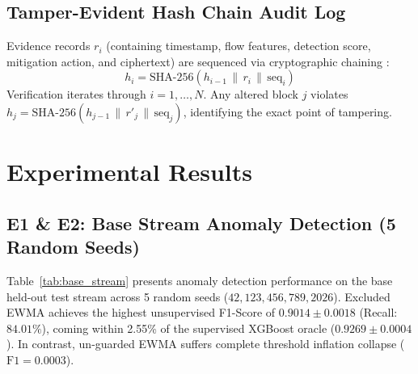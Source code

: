 \documentclass{ieeeaccess}
\begin{document}
\subsection{Tamper-Evident Hash Chain Audit Log}
Evidence records $r_i$ (containing timestamp, flow features, detection score, mitigation action, and ciphertext) are sequenced via cryptographic chaining \cite{haber1991,bellare1996}:
\begin{equation}
h_i = \text{SHA-256}(h_{i-1} \,\|\, r_i \,\|\, \text{seq}_i)
\end{equation}
Verification iterates through $i = 1, \dots, N$. Any altered block $j$ violates $h_j = \text{SHA-256}(h_{j-1} \,\|\, r'_j \,\|\, \text{seq}_j)$, identifying the exact point of tampering.

\section{Experimental Results}
\label{sec:results}

\subsection{E1 & E2: Base Stream Anomaly Detection (5 Random Seeds)}
Table~\ref{tab:base_stream} presents anomaly detection performance on the base held-out test stream across 5 random seeds ($42, 123, 456, 789, 2026$). Excluded EWMA achieves the highest unsupervised F1-Score of $0.9014 \pm 0.0018$ (Recall: $84.01\%$), coming within 2.55\% of the supervised XGBoost oracle ($0.9269 \pm 0.0004$). In contrast, un-guarded EWMA suffers complete threshold inflation collapse ($\text{F1} = 0.0003$).
\end{document}
